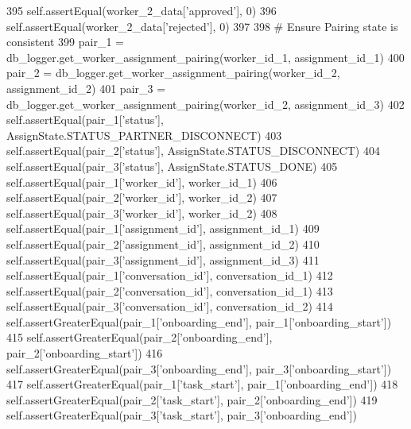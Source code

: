 \begin{DoxyCode}
395         self.assertEqual(worker\_2\_data[\textcolor{stringliteral}{'approved'}], 0)
396         self.assertEqual(worker\_2\_data[\textcolor{stringliteral}{'rejected'}], 0)
397 
398         \textcolor{comment}{# Ensure Pairing state is consistent}
399         pair\_1 = db\_logger.get\_worker\_assignment\_pairing(worker\_id\_1, assignment\_id\_1)
400         pair\_2 = db\_logger.get\_worker\_assignment\_pairing(worker\_id\_2, assignment\_id\_2)
401         pair\_3 = db\_logger.get\_worker\_assignment\_pairing(worker\_id\_2, assignment\_id\_3)
402         self.assertEqual(pair\_1[\textcolor{stringliteral}{'status'}], AssignState.STATUS\_PARTNER\_DISCONNECT)
403         self.assertEqual(pair\_2[\textcolor{stringliteral}{'status'}], AssignState.STATUS\_DISCONNECT)
404         self.assertEqual(pair\_3[\textcolor{stringliteral}{'status'}], AssignState.STATUS\_DONE)
405         self.assertEqual(pair\_1[\textcolor{stringliteral}{'worker\_id'}], worker\_id\_1)
406         self.assertEqual(pair\_2[\textcolor{stringliteral}{'worker\_id'}], worker\_id\_2)
407         self.assertEqual(pair\_3[\textcolor{stringliteral}{'worker\_id'}], worker\_id\_2)
408         self.assertEqual(pair\_1[\textcolor{stringliteral}{'assignment\_id'}], assignment\_id\_1)
409         self.assertEqual(pair\_2[\textcolor{stringliteral}{'assignment\_id'}], assignment\_id\_2)
410         self.assertEqual(pair\_3[\textcolor{stringliteral}{'assignment\_id'}], assignment\_id\_3)
411         self.assertEqual(pair\_1[\textcolor{stringliteral}{'conversation\_id'}], conversation\_id\_1)
412         self.assertEqual(pair\_2[\textcolor{stringliteral}{'conversation\_id'}], conversation\_id\_1)
413         self.assertEqual(pair\_3[\textcolor{stringliteral}{'conversation\_id'}], conversation\_id\_2)
414         self.assertGreaterEqual(pair\_1[\textcolor{stringliteral}{'onboarding\_end'}], pair\_1[\textcolor{stringliteral}{'onboarding\_start'}])
415         self.assertGreaterEqual(pair\_2[\textcolor{stringliteral}{'onboarding\_end'}], pair\_2[\textcolor{stringliteral}{'onboarding\_start'}])
416         self.assertGreaterEqual(pair\_3[\textcolor{stringliteral}{'onboarding\_end'}], pair\_3[\textcolor{stringliteral}{'onboarding\_start'}])
417         self.assertGreaterEqual(pair\_1[\textcolor{stringliteral}{'task\_start'}], pair\_1[\textcolor{stringliteral}{'onboarding\_end'}])
418         self.assertGreaterEqual(pair\_2[\textcolor{stringliteral}{'task\_start'}], pair\_2[\textcolor{stringliteral}{'onboarding\_end'}])
419         self.assertGreaterEqual(pair\_3[\textcolor{stringliteral}{'task\_start'}], pair\_3[\textcolor{stringliteral}{'onboarding\_end'}])

\end{DoxyCode}
